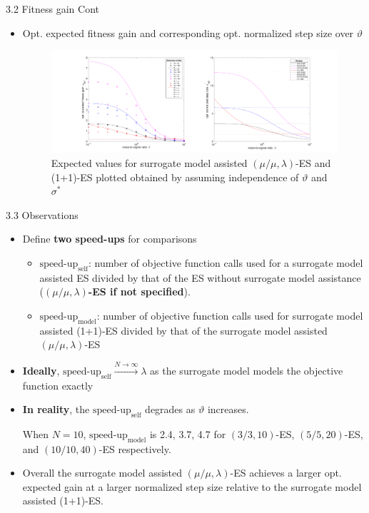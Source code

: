 \documentclass{beamer}
\begin{document}
\begin{frame}{3.2 Fitness gain Cont}
\begin{itemize}
    \item Opt. expected fitness gain and corresponding opt. normalized step size over $\vartheta$


\begin{figure}
\includegraphics[width=1.0\linewidth]{opt_stepSize_fitGain_final.pdf}
    \caption{Expected values for surrogate model assisted $(\mu/\mu,\lambda)$-ES and (1+1)-ES plotted obtained by assuming independence of $\vartheta$ and $\sigma^*$}
\end{figure}
\end{itemize} 
\end{frame}

\begin{frame}{3.3 Observations}
\begin{itemize}
    \item Define \textbf{two speed-ups} for comparisons 
    \begin{itemize}
        \item $\text{speed-up}_{\text{self}}$: number of objective function calls used for a surrogate model assisted ES divided by that of the ES without surrogate model assistance (\textbf{$(\mu/\mu,\lambda)$-ES if not specified}). 
        \item $\text{speed-up}_{\text{model}}$: number of objective function calls used for surrogate model assisted (1+1)-ES divided by that of the surrogate model assisted $(\mu/\mu,\lambda)$-ES
    \end{itemize}     
    \item \textbf{Ideally}, $\text{speed-up}_{\text{self}} \overset{N\rightarrow\infty}{\rightarrow} \lambda$ as the surrogate model models the objective function exactly
    \item \textbf{In reality}, the  $\text{speed-up}_{\text{self}}$ degrades as $\vartheta$ increases. 
    
    When $N=10$, $\text{speed-up}_{\text{model}}$ is 2.4, 3.7, 4.7 for $(3/3,10)$-ES, $(5/5,20)$-ES, and $(10/10,40)$-ES respectively. 
    \item Overall the surrogate model assisted $(\mu/\mu,\lambda)$-ES achieves a larger opt. expected gain at a larger normalized step size relative to the surrogate model assisted (1+1)-ES. 
\end{itemize}
\end{frame}
\end{document}
